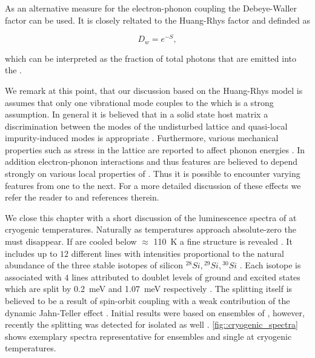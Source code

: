    As an alternative measure for the electron-phonon coupling the Debeye-Waller factor can be used. It is closely reltated to the Huang-Rhys factor and definded as

   \begin{equation}
     D_w = e^{-S},
   \end{equation}

    which can be interpreted as the fraction of total photons that are emitted into the \zpl.

    We remark at this point, that our discussion based on the Huang-Rhys model is assumes that only one vibrational mode couples to the \cc which is a strong assumption. In general it is believed that in a solid state host matrix a discrimination between the modes of the undisturbed lattice and quasi-local impurity-induced modes is appropriate \cite{Zaitsev2000, Feng1993b, Solin1970}. Furthermore, various mechanical properties such as stress in the lattice are reported to affect phonon energies \cite{Grimsditch1978}. In addition electron-phonon interactions and thus \psb features are believed to depend strongly on various local properties of \ccs \cite{Sternschulte1994, Huttner1995}. Thus it is possible to encounter varying \psb features from one \siv to the next. For a more detailed discussion of these effects we refer the reader to \cite{neu2012, Riedrich-moller2014} and references therein.

    We close this chapter with a short discussion of the luminescence spectra of \sivs at cryogenic temperatures. Naturally as temperatures approach absolute-zero the \psb must disappear. If \sivs are cooled below $\approx$ \SI{110}{\kelvin} a fine structure is revealed \cite{becker::45}. It includes up to $12$ different lines with intensities proportional to the natural abundance of the three stable isotopes of silicon ${}^{28}Si, {}^{29}Si, {}^{30}Si$ \cite{Clark1995}. Each isotope is associated with $4$ lines attributed to doublet levels of ground and excited states which are split by \SI{0.2}{\milli\eV} and \SI{1.07}{\milli\eV} respectively \cite{Rogers2014, Hepp2014, Clark1995}. The splitting itself is believed to be a result of spin-orbit coupling with a weak contribution of the dynamic Jahn-Teller effect \cite{Hepp2014}. Initial results were based on ensembles of \sivs, however, recently the splitting was detected for isolated \sivs as well \cite{Dietrich2014a}. \cref{fig::cryogenic_spectra} shows exemplary spectra representative for ensembles and single \siv at cryogenic temperatures.

